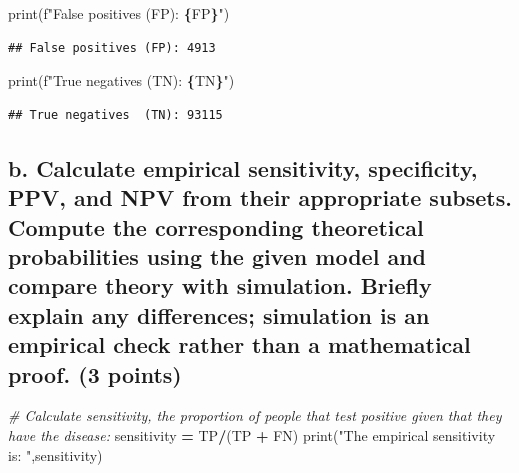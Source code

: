 \documentclass[
]{article}
\newenvironment{Shaded}{\begin{snugshade}}{\end{snugshade}}
\newcommand{\BuiltInTok}[1]{#1}
\newcommand{\CommentTok}[1]{\textcolor[rgb]{0.56,0.35,0.01}{\textit{#1}}}
\newcommand{\NormalTok}[1]{#1}
\newcommand{\OperatorTok}[1]{\textcolor[rgb]{0.81,0.36,0.00}{\textbf{#1}}}
\newcommand{\SpecialCharTok}[1]{\textcolor[rgb]{0.81,0.36,0.00}{\textbf{#1}}}
\newcommand{\SpecialStringTok}[1]{\textcolor[rgb]{0.31,0.60,0.02}{#1}}
\newcommand{\StringTok}[1]{\textcolor[rgb]{0.31,0.60,0.02}{#1}}
\begin{document}
\begin{Shaded}
\begin{Highlighting}[]
\BuiltInTok{print}\NormalTok{(}\SpecialStringTok{f"False positives (FP): }\SpecialCharTok{\{}\NormalTok{FP}\SpecialCharTok{\}}\SpecialStringTok{"}\NormalTok{)}
\end{Highlighting}
\end{Shaded}

\begin{verbatim}
## False positives (FP): 4913
\end{verbatim}

\begin{Shaded}
\begin{Highlighting}[]
\BuiltInTok{print}\NormalTok{(}\SpecialStringTok{f"True negatives  (TN): }\SpecialCharTok{\{}\NormalTok{TN}\SpecialCharTok{\}}\SpecialStringTok{"}\NormalTok{)}
\end{Highlighting}
\end{Shaded}

\begin{verbatim}
## True negatives  (TN): 93115
\end{verbatim}

\subsection{b. Calculate empirical sensitivity, specificity, PPV, and
NPV from their appropriate subsets. Compute the corresponding
theoretical probabilities using the given model and compare theory with
simulation. Briefly explain any differences; simulation is an empirical
check rather than a mathematical proof. (3
points)}\label{b.-calculate-empirical-sensitivity-specificity-ppv-and-npv-from-their-appropriate-subsets.-compute-the-corresponding-theoretical-probabilities-using-the-given-model-and-compare-theory-with-simulation.-briefly-explain-any-differences-simulation-is-an-empirical-check-rather-than-a-mathematical-proof.-3-points}

\begin{Shaded}
\begin{Highlighting}[]
\CommentTok{\# Calculate sensitivity, the proportion of people that test positive given that they have the disease:}
\NormalTok{sensitivity }\OperatorTok{=}\NormalTok{ TP}\OperatorTok{/}\NormalTok{(TP }\OperatorTok{+}\NormalTok{ FN)}
\BuiltInTok{print}\NormalTok{(}\StringTok{"The empirical sensitivity is: "}\NormalTok{,sensitivity)}
\end{Highlighting}
\end{Shaded}
\end{document}
